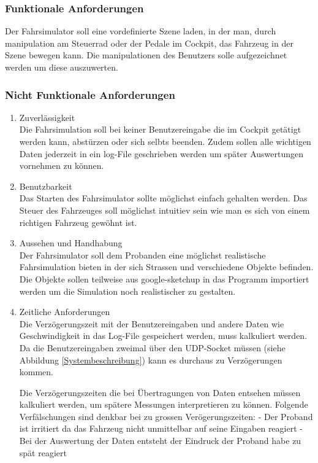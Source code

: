 \subsubsection{Funktionale Anforderungen}
Der Fahrsimulator soll eine vordefinierte Szene laden, in der man, durch manipulation am Steuerrad oder der Pedale im Cockpit, das Fahrzeug in der Szene bewegen kann. Die manipulationen des Benutzers solle aufgezeichnet werden um diese auszuwerten. 
\subsubsection {Nicht Funktionale Anforderungen}
\renewcommand{\labelenumi}{\alph{enumi})}
\begin{enumerate}
\item Zuverlässigkeit\\
Die Fahrsimulation soll bei keiner Benutzereingabe die im Cockpit getätigt werden kann, abstürzen oder sich selbts beenden. Zudem sollen alle wichtigen Daten jederzeit in ein log-File geschrieben werden um später Auswertungen vornehmen zu können. 
\item Benutzbarkeit\\
Das Starten des Fahrsimulator sollte möglichst einfach gehalten werden. Das Steuer des Fahrzeuges soll möglichst intuitiev sein wie man es sich von einem richtigen Fahrzeug gewöhnt ist. 
\item Aussehen und Handhabung\\
Der Fahrsimulator soll dem Probanden eine möglichst realistische Fahrsimulation bieten in der sich Strassen und verschiedene Objekte befinden. Die Objekte sollen teilweise aus google-sketchup in das Programm importiert werden um die Simulation noch realistischer zu gestalten. 
\item Zeitliche Anforderungen\\
Die Verzögerungszeit mit der Benutzereingaben und andere Daten wie Geschwindigkeit in das Log-File gespeichert werden, muss kalkuliert werden. Da die Benutzereingaben zweimal über den UDP-Socket müssen (siehe Abbildung \ref{Systembeschreibung}) kann es durchaus zu Verzögerungen kommen. 


Die Verzögerungszeiten die bei Übertragungen von Daten entsehen müssen kalkuliert werden, um spätere Messungen interpretieren zu können. Folgende Verfälschungen sind denkbar bei zu grossen Verögerungszeiten: 
- Der Proband ist irritiert da das Fahrzeug nicht unmittelbar auf seine Eingaben reagiert
- Bei der Auswertung der Daten entsteht der Eindruck der Proband habe zu spät reagiert


\end{enumerate}
